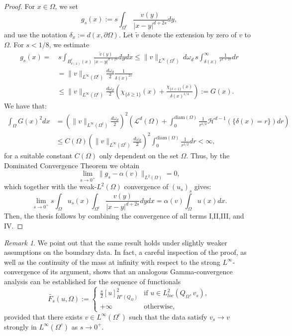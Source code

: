 \documentclass[reqno,11pt]{amsart}
\numberwithin{equation}{section}
\theoremstyle{definition} %
\theoremstyle{plain}
\theoremstyle{definition}
\theoremstyle{remark}
\newtheorem{remark}[remark]{Remark}
\def\O{\Omega}
\def\L{\mathcal{L}}
\begin{document}
\begin{proof}
    For $x\in\O$, we set
    \begin{equation*}
        g_s(x):=s\int_{\O^c}\frac{v(y)}{|x-y|^{d+2s}}dy,
    \end{equation*}
    and use the notation $\delta_x:=d(x,\partial \Omega)$. Let $\tilde{v}$ denote the extension by zero of $v$ to $\O$. For $s<1/8$, we estimate
    \begin{align*}
         g_s(x)= &\, s\int_{B_{\delta(x)}^c(x)}\frac{\tilde{v}(y)}{|x-y|^{d+2s}}dydx\leq \|v\|_{L^\infty(\Omega^c)} \,d\omega_d\,s\int_{\delta(x)}^\infty\frac{1}{r^{1+2s}}dr\\
        &=\|v\|_{L^\infty(\Omega^c)}\frac{d\omega_d}{2}\frac{1}{\delta(x)^{2s}}\\
        &\leq \|v\|_{L^\infty(\Omega^c)}\frac{d\omega_d}{2}\left(\chi_{\{\delta\geq 1\}}(x)+\frac{\chi_{\{\delta<1\}}(x)}{\delta(x)^{1/4}}\right):=G(x).
    \end{align*}
    We have that:
    \begin{align*}
        \int_\O G(x)^2dx&=\left(\|v\|_{L^\infty(\Omega^c)}\frac{d\omega_d}{2}\right)^2\left(\L^d(\O)+\int_0^{\mathrm{diam}(\O)}\frac{1}{r^{1/2}}\mathcal{H}^{d-1}(\{\delta(x)=r\})dr\right)\\
        &\leq C(\O)\left(\|v\|_{L^\infty(\Omega^c)}\frac{d\omega_d}{2}\right)^2\int_0^{\mathrm{diam}(\O)}\frac{1}{r^{1/2}}dr<\infty,
    \end{align*}
    for a suitable constant $C(\O)$ only dependent on the set $\O$.
    Thus, by the Dominated Convergence Theorem we obtain
    \begin{equation*}
        \lim_{s\to0^+}\|g_s-\alpha(v)\|_{L^2(\O)}=0,
    \end{equation*}
    which together with the weak-$L^2(\O)$ convergence of $(u_s)_s$ gives:
    \begin{equation}
        \lim_{s\to0^+}s\int_\O u_s(x)\int_{\O^c}\frac{v(y)}{|x-y|^{d+2s}}dydx=\alpha(v)\int_\O u(x)dx.
    \end{equation}
    Then, the thesis follows by combining the convergence of all terms I,II,III, and IV.
\end{proof}
\begin{remark}
    We point out that the same result holds under slightly weaker assumptions on the boundary data. In fact, a careful inspection of the proof, as well as the continuity of the mass at infinity with respect to the strong $L^\infty$-convergence of its argument, shows that an analogous Gamma-convergence analysis can be established for the sequence of functionals
    \begin{equation*}
    \widetilde{F_s}(u,\O):=\begin{cases}\frac{s}{2}[u]_{H^s(Q_\O)}^2&\text{if }u\in L^2_{loc}(Q_\O,v_s),\\
    +\infty&\text{otherwise},
    \end{cases}
\end{equation*}
provided that there exists $v\in L^{\infty}(\O^c)$ such that the data satisfy $v_s\to v$  strongly in $L^{\infty}(\O^c)$ as $s\to 0^+$.\end{remark}
\end{document}

